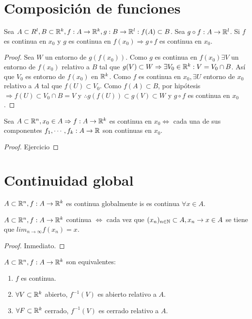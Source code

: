 \section{Composición de funciones}

\begin{theorem}
  Sea $A \subset R^l, B \subset \mathbb{R}^k, f: A \to \mathbb{R}^k, g: B \to \mathbb{R}^l : f(A) \subset B$. Sea $g \circ f: A \to \mathbb{R}^l$. Si $f$ es continua en $x_0$ y $g$ es continua en $f(x_0) \Rightarrow g \circ f$ es continua en $x_0$.
  \begin{proof}
    Sea $W$ un entorno de $g(f(x_0))$. Como $g$ es continua en $f(x_0) \exists V$ un entorno de $f(x_0)$ relativo a $B$ tal que $g(V) \subset W \Rightarrow \exists V_0 \in \mathbb{R}^k : V = V_0 \cap B$. Así que $V_0$ es entorno de $f(x_0)$ en $\mathbb{R}^k$. Como $f$ es continua en $x_0, \exists U$ entorno de $x_0$ relativo a $A$ tal que $f(U) \subset V_0$. Como $f(A) \subset B$, por hipótesis $\Rightarrow f(U) \subset V_0 \cap B = V$ y $\therefore g(f(U)) \subset g(V) \subset W$ y $g \circ f$ es continua en $x_0$. 
  \end{proof}
\end{theorem}

\begin{prop}
  Sea $A \subset \mathbb{R}^n, x_0 \in A \Rightarrow f: A \to \mathbb{R}^k$ es continua en $x_0 \iff$ cada una de sus componentes $f_1, \cdots, f_k: A \to \mathbb{R}$ son continuas en $x_0$.
  \begin{proof}
    Ejercicio
  \end{proof}
\end{prop}

\section{Continuidad global}

\begin{definition}
  $A \subset \mathbb{R}^n, f: A \to \mathbb{R}^k$ es continua globalmente is es continua $\forall x \in A$.
\end{definition}

\begin{prop}
  $A \subset \mathbb{R}^n, f: A \to \mathbb{R}^k$ continua $\iff$ cada vez que $(x_n)_{n \in \mathbb{N}} \subset A, x_n \to x \in A$ se tiene que $lim_{n \to \infty} f(x_n) = x$.
  \begin{proof}
    Inmediato.
  \end{proof}
\end{prop}

\begin{prop}
  $A \subset \mathbb{R}^n, f: A \to \mathbb{R}^k$ son equivalentes:
  \begin{enumerate}
    \item $f$ es continua.
    \item $\forall V \subset \mathbb{R}^k$ abierto, $f^{-1}(V)$ es abierto relativo a $A$.
    \item $\forall F \subset \mathbb{R}^k$ cerrado, $f^{-1}(V)$ es cerrado relativo a $A$.
  \end{enumerate}
\end{prop}

